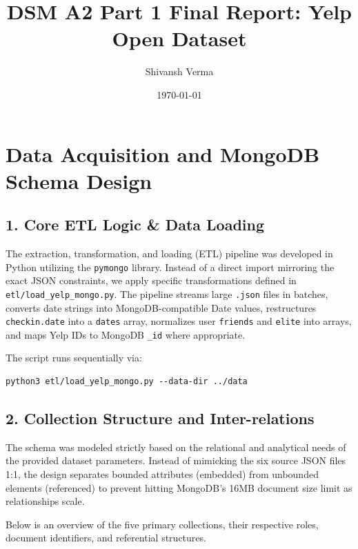 \documentclass[11pt,a4paper]{article}
\title{\textbf{DSM A2 Part 1 Final Report: Yelp Open Dataset}}
\author{Shivansh Verma}
\date{\today}
\begin{document}
\maketitle

\tableofcontents
\newpage


\section{Data Acquisition and MongoDB Schema Design}

\subsection*{1. Core ETL Logic \& Data Loading}
The extraction, transformation, and loading (ETL) pipeline was developed in Python utilizing the \texttt{pymongo} library. Instead of a direct import mirroring the exact JSON constraints, we apply specific transformations defined in \texttt{etl/load\_yelp\_mongo.py}. The pipeline streams large \texttt{.json} files in batches, converts date strings into MongoDB-compatible Date values, restructures \texttt{checkin.date} into a \texttt{dates} array, normalizes user \texttt{friends} and \texttt{elite} into arrays, and maps Yelp IDs to MongoDB \texttt{\_id} where appropriate.

The script runs sequentially via:
\begin{verbatim}
python3 etl/load_yelp_mongo.py --data-dir ../data
\end{verbatim}

\subsection*{2. Collection Structure and Inter-relations}
The schema was modeled strictly based on the relational and analytical needs of the provided dataset parameters. Instead of mimicking the six source JSON files 1:1, the design separates bounded attributes (embedded) from unbounded elements (referenced) to prevent hitting MongoDB's 16MB document size limit as relationships scale.

Below is an overview of the five primary collections, their respective roles, document identifiers, and referential structures.
\end{document}
